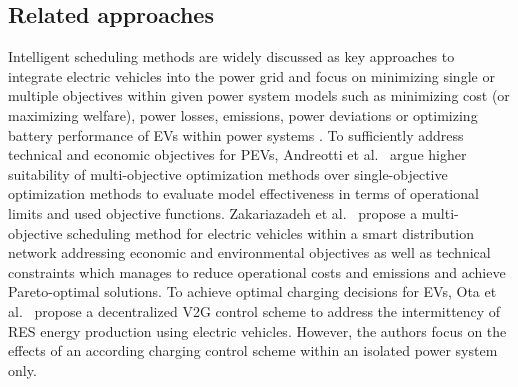 %

\subsection{Related approaches}
\label{approaches}

Intelligent scheduling methods are widely discussed as key approaches to integrate electric vehicles into the power grid and focus on minimizing single or multiple objectives within given power system models such as minimizing cost (or maximizing welfare), power losses, emissions, power deviations or optimizing battery performance of EVs within power systems \cite{yang2015computational}. 
To sufficiently address technical and economic objectives for PEVs, Andreotti et al.~\cite{andreotti2012review} argue higher suitability of multi-objective optimization methods over single-objective optimization methods to evaluate model effectiveness in terms of operational limits and used objective functions. 
Zakariazadeh et al.~\cite{zakariazadeh2014multi} propose a multi-objective scheduling method for electric vehicles within a smart distribution network addressing economic and environmental objectives as well as technical constraints which manages to reduce operational costs and emissions and achieve Pareto-optimal solutions.
To achieve optimal charging decisions for EVs, Ota et al.~\cite{ota2012autonomous} propose a decentralized V2G control scheme to address the intermittency of RES energy production using electric vehicles. However, the authors focus on the effects of an according charging control scheme within an isolated power system only.

